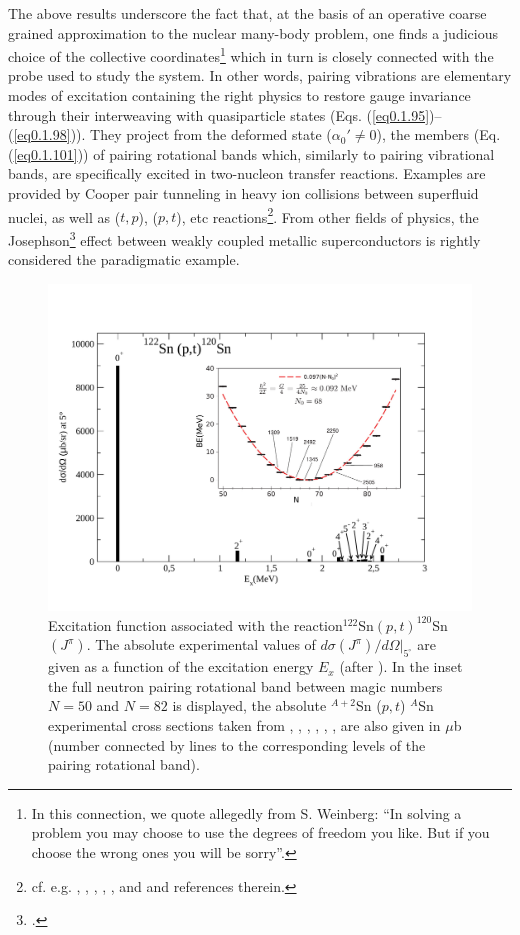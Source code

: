 The above results underscore the fact that, at the basis of an operative coarse grained approximation to the nuclear many-body problem, one finds a judicious choice of the collective coordinates\footnote{In this connection, we quote allegedly from S. Weinberg: ``In solving a problem you may choose to use the degrees of freedom you like. But if you choose the wrong ones you will be sorry''.} which in turn is closely connected with the probe used to study the system. In other words, pairing vibrations are elementary modes of excitation containing the right physics to restore gauge invariance through their interweaving with  quasiparticle states (Eqs. (\ref{eq0.1.95})--(\ref{eq0.1.98})). They project from the deformed state ($\alpha_0'\neq0$), the members (Eq. (\ref{eq0.1.101})) of pairing rotational bands which, similarly to pairing vibrational bands, are specifically excited in two-nucleon transfer reactions. Examples are provided by Cooper pair tunneling in heavy ion collisions between superfluid nuclei, as well as ($t,p$), ($p,t$), etc reactions\footnote{cf. e.g. \cite{Yoshida:62}, \cite{Broglia:73}, \cite{Bayman:71}, \cite{Glendenning:65}, \cite{Bohr:64}, \cite{Hansen:12} and \cite{Potel:13} and references therein.}. From other fields of physics, the Josephson\footnote{\cite{Josephson:62}.} effect between weakly coupled metallic superconductors is rightly considered the paradigmatic example.  
  \begin{figure}
  \centerline{\includegraphics*[width=\textwidth,angle=0]{nutshell/figs/ExcitedSn122pt.pdf}}
  \caption{Excitation function associated with the reaction$^{122}$Sn$(p,t)^{120}$Sn$(J^\pi)$. The absolute experimental values of $d\sigma(J^\pi)/d\Omega|_{5^\circ}$ are given as a function of the excitation energy $E_x$ (after \cite{Guazzoni:11}). In the inset the full neutron pairing rotational band between magic numbers $N=50$ and $N=82$ is  displayed, the absolute $^{A+2}$Sn ($p,t$) $^{A}$Sn experimental cross sections taken from \cite{Guazzoni:99}, \cite{Guazzoni:04}, \cite{Guazzoni:06}, \cite{Guazzoni:08}, \cite{Guazzoni:11}, \cite{Guazzoni:12}, are also given in $\mu$b (number connected by lines to the corresponding levels of the pairing rotational band).}\label{fig1.3}
  \end{figure}
